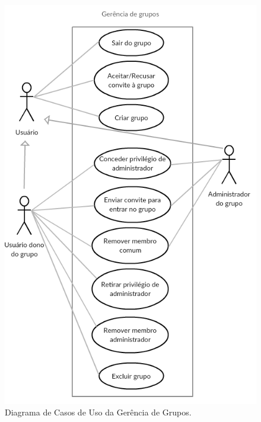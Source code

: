 \documentclass[11pt,a4paper,titlepage]{article}
\begin{document}
\begin{figure}[!h]
	\centering
	\includegraphics[scale=0.8]{img/casosgrupos.png}
	\caption{Diagrama de Casos de Uso da Gerência de Grupos.}
\end{figure}
\end{document}
